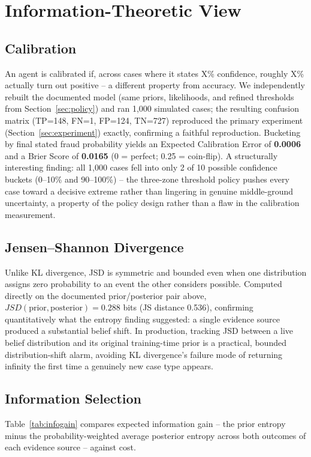 \documentclass[10pt]{article}
\begin{document}
\section{Information-Theoretic View}

\subsection{Calibration}
An agent is calibrated if, across cases where it states X\% confidence,
roughly X\% actually turn out positive -- a different property from
accuracy. We independently rebuilt the documented model (same priors,
likelihoods, and refined thresholds from Section~\ref{sec:policy}) and
ran 1{,}000 simulated cases; the resulting confusion matrix (TP=148,
FN=1, FP=124, TN=727) reproduced the primary experiment
(Section~\ref{sec:experiment}) exactly, confirming a faithful
reproduction. Bucketing by final stated fraud probability yields an
Expected Calibration Error of \textbf{0.0006} and a Brier Score of
\textbf{0.0165} (0 = perfect; 0.25 = coin-flip). A structurally
interesting finding: all 1{,}000 cases fell into only 2 of 10 possible
confidence buckets (0--10\% and 90--100\%) -- the three-zone threshold
policy pushes every case toward a decisive extreme rather than
lingering in genuine middle-ground uncertainty, a property of the
policy design rather than a flaw in the calibration measurement.

\subsection{Jensen--Shannon Divergence}
Unlike KL divergence, JSD is symmetric and bounded even when one
distribution assigns zero probability to an event the other considers
possible. Computed directly on the documented prior/posterior pair
above, $JSD(\text{prior},\text{posterior}) = 0.288$ bits (JS distance
0.536), confirming quantitatively what the entropy finding suggested:
a single evidence source produced a substantial belief shift. In
production, tracking JSD between a live belief distribution and its
original training-time prior is a practical, bounded distribution-shift
alarm, avoiding KL divergence's failure mode of returning infinity the
first time a genuinely new case type appears.

\subsection{Information Selection}
Table~\ref{tab:infogain} compares expected information gain -- the
prior entropy minus the probability-weighted average posterior entropy
across both outcomes of each evidence source -- against cost.
\end{document}
